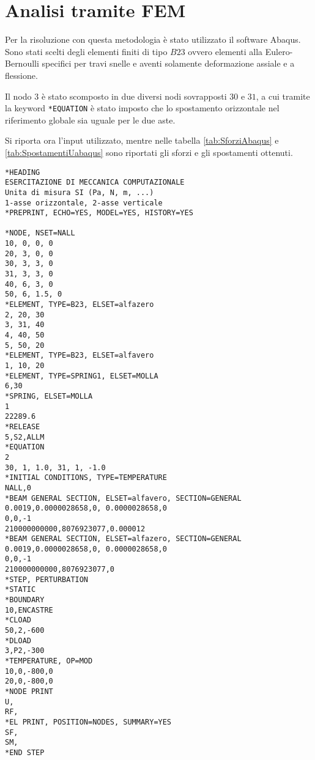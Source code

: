 \section{Analisi tramite FEM}
Per la risoluzione con questa metodologia è stato utilizzato il software Abaqus. 
Sono stati scelti degli elementi finiti di tipo $B23$ ovvero elementi alla Eulero-Bernoulli specifici per travi snelle e aventi solamente deformazione assiale e a flessione.

Il nodo $3$ è stato scomposto in due diversi nodi sovrapposti $30$ e $31$, a cui tramite la keyword \lstinline{*EQUATION} è stato imposto che lo spostamento orizzontale nel riferimento globale sia uguale per le due aste.

Si riporta ora l'input utilizzato, mentre nelle tabella \ref{tab:SforziAbaqus} e \ref{tab:SpostamentiUabaqus} sono riportati gli sforzi e gli spostamenti ottenuti.
\begin{lstlisting} 
*HEADING
ESERCITAZIONE DI MECCANICA COMPUTAZIONALE
Unita di misura SI (Pa, N, m, ...)
1-asse orizzontale, 2-asse verticale
*PREPRINT, ECHO=YES, MODEL=YES, HISTORY=YES

*NODE, NSET=NALL
10, 0, 0, 0
20, 3, 0, 0
30, 3, 3, 0
31, 3, 3, 0
40, 6, 3, 0
50, 6, 1.5, 0
*ELEMENT, TYPE=B23, ELSET=alfazero
2, 20, 30
3, 31, 40
4, 40, 50
5, 50, 20
*ELEMENT, TYPE=B23, ELSET=alfavero
1, 10, 20
*ELEMENT, TYPE=SPRING1, ELSET=MOLLA
6,30
*SPRING, ELSET=MOLLA
1
22289.6
*RELEASE
5,S2,ALLM
*EQUATION 
2 
30, 1, 1.0, 31, 1, -1.0
*INITIAL CONDITIONS, TYPE=TEMPERATURE
NALL,0
*BEAM GENERAL SECTION, ELSET=alfavero, SECTION=GENERAL
0.0019,0.0000028658,0, 0.0000028658,0
0,0,-1
210000000000,8076923077,0.000012
*BEAM GENERAL SECTION, ELSET=alfazero, SECTION=GENERAL
0.0019,0.0000028658,0, 0.0000028658,0
0,0,-1
210000000000,8076923077,0
*STEP, PERTURBATION
*STATIC
*BOUNDARY
10,ENCASTRE
*CLOAD
50,2,-600
*DLOAD
3,P2,-300
*TEMPERATURE, OP=MOD
10,0,-800,0
20,0,-800,0
*NODE PRINT
U,
RF,
*EL PRINT, POSITION=NODES, SUMMARY=YES
SF,
SM,
*END STEP
\end{lstlisting}
%
